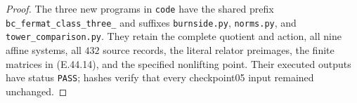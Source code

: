 \begin{proof}
The three new programs in \texttt{code} have the shared
prefix \texttt{bc\_fermat\_class\_three\_} and suffixes
\texttt{burnside.py}, \texttt{norms.py}, and
\texttt{tower\_comparison.py}.  They
retain the complete quotient and action,
all nine affine systems, all $432$ source
records, the literal relator preimages,
the finite matrices in \textup{(E.44.14)}, and
the specified nonlifting point.  Their executed
outputs have status \texttt{PASS}; hashes verify
that every checkpoint05 input remained unchanged.
\end{proof}
